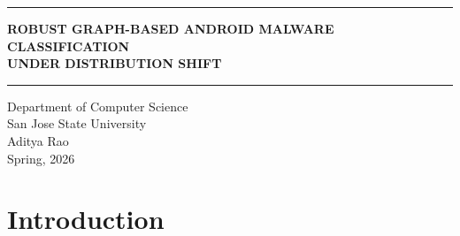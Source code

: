 \documentclass[12pt]{article}
\begin{document}
\begin{center}
\vspace*{0.2cm}
\hrule
\vspace{0.45cm}

{\Large \textbf{ROBUST GRAPH-BASED ANDROID MALWARE CLASSIFICATION\\
UNDER DISTRIBUTION SHIFT}}\\

\vspace{0.35cm}
\hrule
\vspace{0.6cm}

{\normalsize
Department of Computer Science\\
San Jose State University\\
\vspace{0.35cm}
Aditya Rao\\
Spring, 2026\\
}

\end{center}

\vfill

\newpage

\tableofcontents
\newpage


\section{Introduction}
\end{document}
